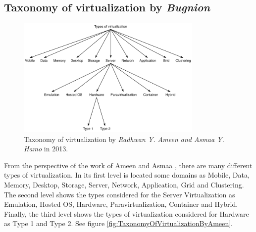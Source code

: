 	\subsection{Taxonomy of virtualization by \textit{Bugnion}}
	
	\begin{figure}[H]
		\centering
		\includegraphics[width=9cm]{images/AmeenAndHamo2003.pdf}
		\vspace{-0.2cm}
		\caption{Taxonomy of virtualization by \textit{Radhwan Y. Ameen and Asmaa Y. Hamo} in 2013.}
		\label{fig:TaxonomyOfVirtualizationBugnion}
	\end{figure}
	
    From the perspective of the work of Ameen and Asmaa \cite{Ameen2013}, there are many different types of virtualization. In its first level is located some domains as  Mobile, Data, Memory, Desktop, Storage, Server, Network, Application, Grid and Clustering. The second level shows the types considered for the Server Virtualization as Emulation, Hosted OS, Hardware, Paravirtualization, Container and Hybrid. Finally, the third level shows the types of virtualization considered for Hardware as Type 1 and Type 2. See figure \ref{fig:TaxonomyOfVirtualizationByAmeen}.
  
